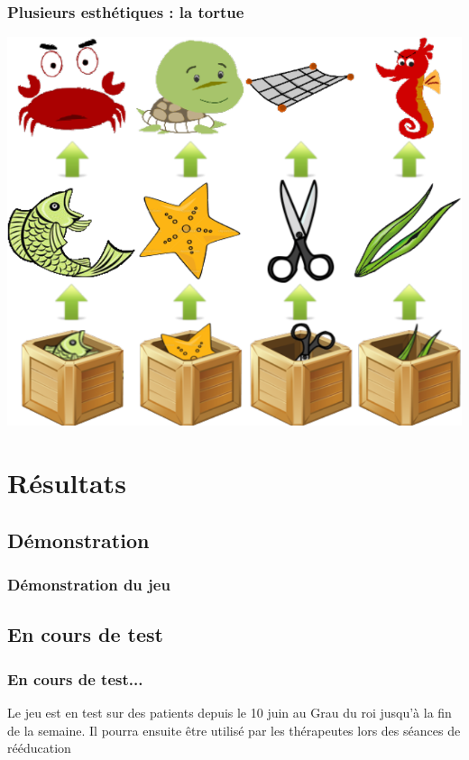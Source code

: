 \documentclass{beamer}
\begin{document}
\begin{frame}
\frametitle{Plusieurs esthétiques : la tortue}
\begin{center}
\includegraphics[scale=0.23]{images/esthetique2.png}
\end{center}
\end{frame}

\section{Résultats}

\subsection{Démonstration}
\begin{frame}
\frametitle{Démonstration du jeu}
\href{run:jar/rollingcat}{}
\end{frame}

\subsection{En cours de test}
\begin{frame}
\frametitle{En cours de test...}
Le jeu est en test sur des patients depuis le 10 juin au Grau du roi jusqu'à la fin de la semaine. Il pourra ensuite être utilisé par les thérapeutes lors des séances de rééducation
\end{frame}
\end{document}
